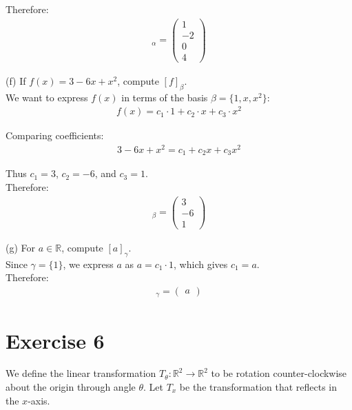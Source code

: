 \documentclass{article}
\begin{document}
Therefore:
\begin{align*}
[A]_{\alpha} = \begin{pmatrix} 1 \\ -2 \\ 0 \\ 4 \end{pmatrix}
\end{align*}

(f) If $f(x) = 3 - 6x + x^2$, compute $[f]_{\beta}$. \\

We want to express $f(x)$ in terms of the basis $\beta = \{1, x, x^2\}$:
\begin{align*}
f(x) = c_1\cdot 1 + c_2 \cdot x + c_3 \cdot x^2
\end{align*}

Comparing coefficients:
\begin{align*}
3 - 6x + x^2 = c_1 + c_2 x + c_3 x^2
\end{align*}

Thus $c_1 = 3$, $c_2 = -6$, and $c_3 = 1$. \\

Therefore:
\begin{align*}
[f]_{\beta} = \begin{pmatrix} 3 \\ -6 \\ 1 \end{pmatrix}
\end{align*}

(g) For $a \in \mathbb{R}$, compute $[a]_{\gamma}$. \\

Since $\gamma = \{1\}$, we express $a$ as $a = c_1 \cdot 1$, which gives $c_1 = a$. \\

Therefore:
\begin{align*}
[a]_{\gamma} = \begin{pmatrix} a \end{pmatrix}
\end{align*}

\newpage

\section*{Exercise 6}
We define the linear transformation $T_{\theta} : \mathbb{R}^2 \to \mathbb{R}^2$ to be rotation counter-clockwise about the origin through angle $\theta$. Let $T_x$ be the transformation that reflects in the $x$-axis.
\end{document}
